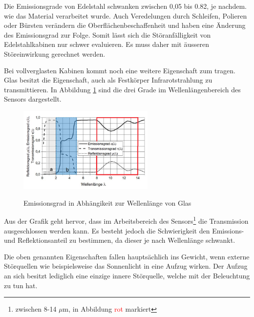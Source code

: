 Die Emissionsgrade von Edelstahl schwanken zwischen 0,05 bis 0.82, je nachdem. wie das Material verarbeitet wurde. Auch Veredelungen durch Schleifen, Polieren oder Bürsten verändern die Oberflächenbeschaffenheit und haben eine Änderung des Emissionsgrad zur Folge. Somit lässt sich die Störanfälligkeit von Edelstahlkabinen nur schwer evaluieren. Es muss daher mit äusseren Störeinwirkung gerechnet werden. 

Bei vollverglasten Kabinen kommt noch eine weitere Eigenschaft zum tragen. Glas besitzt die Eigenschaft, auch als Festkörper Infrarotstrahlung zu transmittieren. In Abbildung \ref{fig:Glas} sind die drei Grade im  Wellenlängenbereich des Sensors dargestellt. 

\begin{figure}[H]
	\centering
	\includegraphics[width=0.6\textwidth]
	{fig/Glas_bearbeitet.png}
	\caption[Emissionsgrad in Abhängikeit zur Wellenlnge]{Emissionsgrad in Abhängikeit zur Wellenlänge von Glas}\cite{Glas} 
	\label{fig:Glas}	
\end{figure}

Aus der Grafik geht hervor, dass im Arbeitsbereich des Sensors\footnote[10]{zwischen 8-14 $\mu$m, in Abbildung \textcolor{red}{rot } markiert} die Transmission ausgeschlossen werden kann. Es besteht jedoch die Schwierigkeit den Emissions- und Reflektionsanteil zu bestimmen, da dieser je nach Wellenlänge schwankt.

Die oben genannten Eigenschaften fallen hauptsächlich ins Gewicht, wenn externe Störquellen wie beispielsweise das Sonnenlicht in eine Aufzug wirken. Der Aufzug an sich besitzt lediglich eine einzige innere Störquelle, welche mit der Beleuchtung zu tun hat. 

